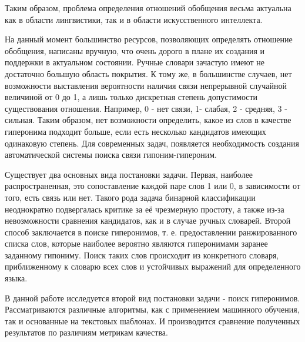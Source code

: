 Таким образом, проблема определения отношений обобщения весьма актуальна как в
области лингвистики, так и в области искусственного интеллекта.

На данный момент большинство ресурсов, позволяющих определять отношение
обобщения, написаны вручную, что очень дорого в плане их создания и поддержки в
актуальном состоянии. Ручные словари зачастую имеют не достаточно большую область
покрытия. К тому же, в большинстве случаев, нет возможности выставления вероятности
наличия связи непрерывной случайной величиной от 0 до 1, а лишь только дискретная
степень допустимости существования отношения. Например, 0 - нет связи, 1- слабая, 2 -
средняя, 3 - сильная. Таким образом, нет возможности определить, какое из слов в
качестве гиперонима подходит больше, если есть несколько кандидатов имеющих
одинаковую степень. Для современных задач, появляется необходимость создания
автоматической системы поиска связи гипоним-гипероним.

Существует два основных вида постановки задачи. Первая, наиболее распространенная,
это сопоставление каждой паре слов 1 или 0, в зависимости от того, есть связь или нет.
Такого рода задача бинарной классификации неоднократно подвергалась критике за её
чрезмерную простоту, а также из-за невозможности сравнения кандидатов, как и в случае
ручных словарей. Второй способ заключается в поиске гиперонимов, т. е. предоставлении
ранжированного списка слов, которые наиболее вероятно являются гиперонимами
заранее заданному гипониму. Поиск таких слов происходит из конкретного словаря,
приближенному к словарю всех слов и устойчивых выражений для определенного языка.

В данной работе исследуется второй вид постановки задачи - поиск гиперонимов.
Рассматриваются различные алгоритмы, как с применением машинного обучения, так и
основанные на текстовых шаблонах. И производится сравнение полученных результатов
по различиям метрикам качества.





